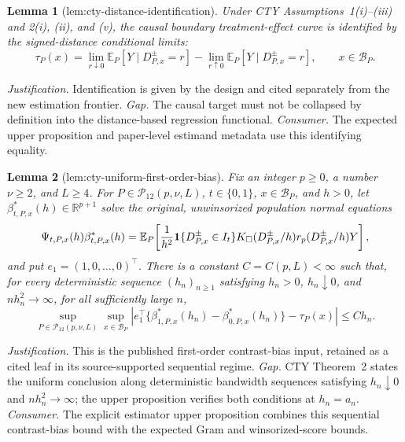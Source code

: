 \documentclass{article}
\newtheorem{lemma}{Lemma}
\begin{document}
\begin{lemma}[lem:cty-distance-identification]\label{lem:cty-distance-identification}
Under CTY Assumptions~1(i)--(iii) and 2(i), (ii), and (v), the causal boundary treatment-effect curve is identified by the signed-distance conditional limits:
\[
 \tau_P(x)=\lim_{r\downarrow0}\mathbb E_P[Y\mid D^{\pm}_{P,x}=r]
 -\lim_{r\uparrow0}\mathbb E_P[Y\mid D^{\pm}_{P,x}=r],
 \qquad x\in\mathcal B_P.
\]
\end{lemma}
\par\smallskip\noindent \textit{Justification.} Identification is given by the design and cited separately from the new estimation frontier. \textit{Gap.} The causal target must not be collapsed by definition into the distance-based regression functional. \textit{Consumer.} The expected upper proposition and paper-level estimand metadata use this identifying equality.

\begin{lemma}[lem:cty-uniform-first-order-bias]\label{lem:cty-uniform-first-order-bias}
Fix an integer \(p\geq0\), a number \(\nu\geq2\), and \(L\geq4\).  For \(P\in\mathcal P_{12}(p,\nu,L)\), \(t\in\{0,1\}\), \(x\in\mathcal B_P\), and \(h>0\), let \(\beta^*_{t,P,x}(h)\in\mathbb R^{p+1}\) solve the original, unwinsorized population normal equations
\[
 \Psi_{t,P,x}(h)\beta^*_{t,P,x}(h)
 =\mathbb E_P\!\left[
 {1\over h^2}\mathbf1\{D^{\pm}_{P,x}\in I_t\}K_\square(D^{\pm}_{P,x}/h)
 r_p(D^{\pm}_{P,x}/h)Y
 \right],
\]
and put \(e_1=(1,0,\ldots,0)^\top\).  There is a constant \(C=C(p,L)<\infty\) such that, for every deterministic sequence \((h_n)_{n\geq1}\) satisfying \(h_n>0\), \(h_n\downarrow0\), and \(nh_n^2\to\infty\), for all sufficiently large \(n\),
\[
 \sup_{P\in\mathcal P_{12}(p,\nu,L)}
 \sup_{x\in\mathcal B_P}
 \left|
 e_1^\top\{\beta^*_{1,P,x}(h_n)-\beta^*_{0,P,x}(h_n)\}-\tau_P(x)
 \right|
 \leq Ch_n.
\]
\end{lemma}
\par\smallskip\noindent \textit{Justification.} This is the published first-order contrast-bias input, retained as a cited leaf in its source-supported sequential regime. \textit{Gap.} CTY Theorem~2 states the uniform conclusion along deterministic bandwidth sequences satisfying \(h_n\downarrow0\) and \(nh_n^2\to\infty\); the upper proposition verifies both conditions at \(h_n=a_n\). \textit{Consumer.} The explicit estimator upper proposition combines this sequential contrast-bias bound with the expected Gram and winsorized-score bounds.
\end{document}
